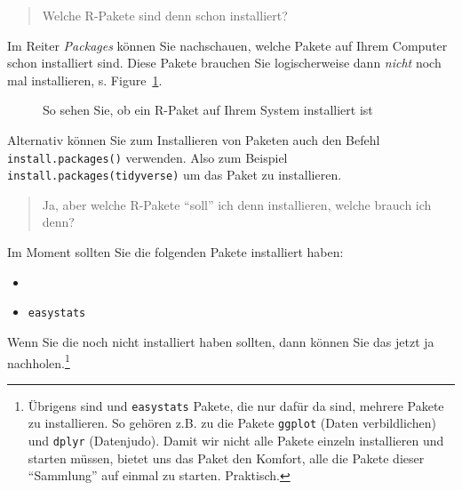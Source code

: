 \documentclass[
  letterpaper,
  DIV=11,
  numbers=noendperiod]{scrartcl}
\providecommand{\tightlist}{%
  \setlength{\itemsep}{0pt}\setlength{\parskip}{0pt}}\usepackage{longtable,booktabs,array}
\theoremstyle{definition}
\theoremstyle{definition}
\theoremstyle{definition}
\theoremstyle{remark}
\begin{document}
\begin{quote}
Welche R-Pakete sind denn schon installiert?
\end{quote}

Im Reiter \emph{Packages} können Sie nachschauen, welche Pakete auf
Ihrem Computer schon installiert sind. Diese Pakete brauchen Sie
logischerweise dann \emph{nicht} noch mal installieren, s.
Figure~\ref{fig-paket-installiert}.

\begin{figure}


\caption{\label{fig-paket-installiert}So sehen Sie, ob ein R-Paket auf
Ihrem System installiert ist}

\end{figure}%

Alternativ können Sie zum Installieren von Paketen auch den Befehl
\texttt{install.packages()} verwenden. Also zum Beispiel
\texttt{install.packages(tidyverse)} um das Paket \texttttidyverse zu
installieren.

\begin{quote}
Ja, aber welche R-Pakete ``soll'' ich denn installieren, welche brauch
ich denn?
\end{quote}

Im Moment sollten Sie die folgenden Pakete installiert haben:

\begin{itemize}
\tightlist
\item
  \texttttidyverse
\item
  \texttt{easystats}
\end{itemize}

Wenn Sie die noch nicht installiert haben sollten, dann können Sie das
jetzt ja nachholen.\footnote{Übrigens sind \texttttidyverse und
  \texttt{easystats} Pakete, die nur dafür da sind, mehrere Pakete zu
  installieren. So gehören z.B. zu \texttttidyverse die Pakete
  \texttt{ggplot} (Daten verbildlichen) und \texttt{dplyr} (Datenjudo).
  Damit wir nicht alle Pakete einzeln installieren und starten müssen,
  bietet uns das Paket \texttttidyverse den Komfort, alle die Pakete
  dieser ``Sammlung'' auf einmal zu starten. Praktisch.}
\end{document}
